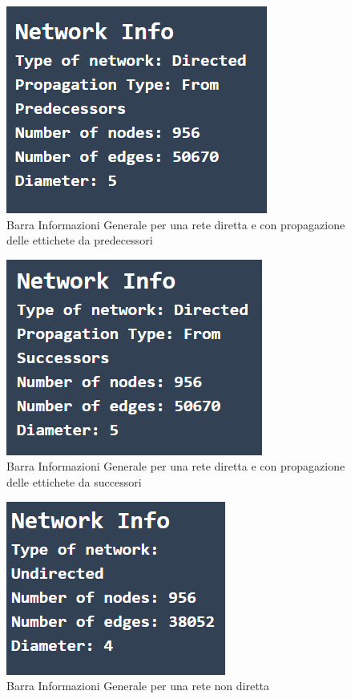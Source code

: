 \documentclass[a4paper,12pt]{report}
\begin{document}
			\begin{center}
				\begin{figure}[H]
				\centering
				\includegraphics[width=0.5\linewidth]{infobargeneralcustom}
				\caption{Barra Informazioni Generale per una rete diretta e con propagazione delle ettichete da predecessori}
				\end{figure}
				\begin{figure}[H]
				\centering
				\includegraphics[width=0.5\linewidth]{infobargeneralcustomdirectedsuccessors}
				\caption{Barra Informazioni Generale per una rete diretta e con propagazione delle ettichete da successori}
				\end{figure}
				\begin{figure}[H]
				\centering
				\includegraphics[width=0.5\linewidth]{infobargeneralcustomundirected}
				\caption{Barra Informazioni Generale per una rete non diretta}
				\end{figure}
			\end{center}
\end{document}
